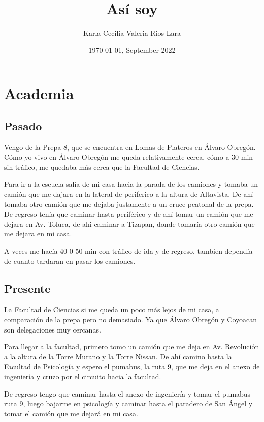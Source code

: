 \documentclass[12pt]{article}
\title{Así soy}
\author{Karla Cecilia Valeria Rios Lara }
\date{\today, September 2022}
\begin{document}
\maketitle


\section{Academia}
\subsection{Pasado}
Vengo de la Prepa 8, que se encuentra en Lomas de Plateros en Álvaro Obregón. Cómo yo vivo en Álvaro Obregón me queda relativamente cerca, cómo a 30 min sin tráfico, me quedaba más cerca que la Facultad de Ciencias.



Para ir a la escuela salía de mi casa hacia la parada de los camiones y tomaba un camión que me dajara en la lateral de periferico a la altura de Altavista. De ahí tomaba otro camión que me dejaba justamente a un cruce peatonal de la prepa. De regreso tenía que caminar hasta periférico y de ahí tomar un camión que me dejara en Av. Toluca, de ahi caminar a Tizapan, donde tomaría otro camión que me dejara en mi casa. 



A veces me hacía 40 0 50 min con tráfico de ida y de regreso, tambien dependía de cuanto tardaran en pasar los camiones.

\subsection{Presente}
La Facultad de Ciencias si me queda un poco más lejos de mi casa, a comparación de la prepa pero no demasiado. Ya que Álvaro Obregón y Coyoacan son delegaciones muy cercanas.



Para llegar a la facultad, primero tomo un camión que me deja en Av. Revolución a la altura de la Torre Murano y la Torre Nissan. De ahí camino hasta la Facultad de Psicología y espero el pumabus, la ruta 9, que me deja en el anexo de ingeniería y cruzo por el circuito hacia la facultad.



De regreso tengo que caminar hasta el anexo de ingeniería y tomar el pumabus ruta 9, luego bajarme en psicología y caminar hasta el paradero de San Ángel y tomar el camión que me dejará en mi casa. 
\end{document}
